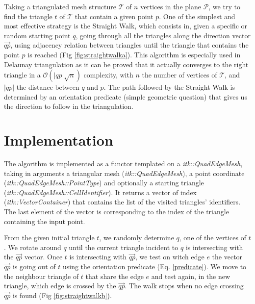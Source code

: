 \documentclass{InsightArticle}
\begin{document}
Taking a triangulated mesh structure $\mathcal{T}$ of $\mathit{n}$ vertices in the plane $\mathcal{P}$, we try to find the triangle $\mathit{t}$ of $\mathcal{T}$ that contain a given point $\mathit{p}$. One of the simplest and most effective strategy is the Straight Walk, which consists in, given a specific or random starting point $\mathit{q}$, going through all the triangles along the direction vector $\overrightarrow{\mathit{qp}}$, using adjacency relation between triangles until the triangle that contains the point $\mathit{p}$ is reached (Fig \ref{fig:straightwalka}).
This algorithm is especially used in Delaunay triangulation as it can be proved that it actually converges to the right triangle in a $\mathcal{O}(\lvert \mathit{qp}\rvert \sqrt{\mathit{n}})$ complexity, with $\mathit{n}$ the number of vertices of $\mathcal{T}$, and $\lvert\mathit{qp}\rvert$ the distance between $\mathit{q}$ and $\mathit{p}$.
The path followed by the Straight Walk is determined by an orientation predicate (simple geometric question) that gives us the direction to follow in the triangulation.

\section{Implementation}

The algorithm is implemented as a functor templated on a \emph{itk::QuadEdgeMesh}, taking in arguments a triangular mesh (\textit{itk::QuadEdgeMesh}), a point coordinate (\textit{itk::QuadEdgeMesh::PointType}) and optionally a starting triangle (\textit{itk::QuadEdgeMesh::CellIdentifier}). It returns a vector of index (\textit{itk::VectorContainer}) that contains the list of the visited triangles' identifiers. The last element of the vector is corresponding to the index of the triangle containing the input point.

From the given initial triangle $\mathit{t}$, we randomly determine $\mathit{q}$, one of the vertices of $\mathit{t}$. We rotate around $\mathit{q}$ until the current triangle incident to $\mathit{q}$ is intersecting with the $\overrightarrow{\mathit{qp}}$ vector. Once $\mathit{t}$ is intersecting with $\overrightarrow{\mathit{qp}}$, we test on witch edge $\mathit{e}$ the vector $\overrightarrow{\mathit{qp}}$ is going out of $\mathit{t}$ using the orientation predicate (Eq. \ref{predicate}). We move to the neighbour triangle of $\mathit{t}$ that share the edge $\mathit{e}$ and test again, in the new triangle, which edge is crossed by the $\overrightarrow{\mathit{qp}}$. The walk stops when no edge crossing $\overrightarrow{\mathit{qp}}$ is found (Fig \ref{fig:straightwalkb}).
\end{document}
